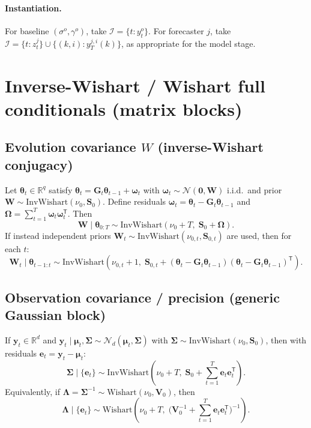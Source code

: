 \documentclass[11pt]{article}
\newcommand{\R}{\mathbb{R}}
\newcommand{\1}{\mathbb{I}}
\newcommand{\N}{\mathcal{N}}
\newcommand{\IW}{\mathrm{InvWishart}}
\newcommand{\W}{\mathrm{Wishart}}
\newcommand{\T}{\mathsf{T}}
\begin{document}
\paragraph{Instantiation.}
For baseline $(\sigma^o,\gamma^o)$, take $\mathcal{I}=\{t: y_t^o\}$.
For forecaster $j$, take $\mathcal{I}=\{t: z_t^j\}\cup\{(k,i): y_T^{j,i}(k)\}$, as appropriate for the model stage.

\section{Inverse-Wishart / Wishart full conditionals (matrix blocks)}

\subsection{Evolution covariance \texorpdfstring{$W$}{W} (inverse-Wishart conjugacy)}
Let $\bm\theta_t\in\R^q$ satisfy $\bm\theta_t=\bm G_t\bm\theta_{t-1}+\bm\omega_t$ with $\bm\omega_t\sim\N(\bm 0,\bm W)$ i.i.d.\ and prior $\bm W\sim \IW(\nu_0,\bm S_0)$.
Define residuals $\bm\omega_t=\bm\theta_t-\bm G_t\bm\theta_{t-1}$ and $\bm\Omega=\sum_{t=1}^T \bm\omega_t\bm\omega_t^\T$.
Then
\begin{equation}
\bm W\mid \bm\theta_{0:T}\sim \IW(\nu_0+T,\;\bm S_0+\bm\Omega).\label{eq:cond_W_const}
\end{equation}
If instead independent priors $\bm W_t\sim \IW(\nu_{0,t},\bm S_{0,t})$ are used, then for each $t$:
\begin{equation}
\bm W_t\mid \bm\theta_{t-1:t}\sim \IW\!\left(\nu_{0,t}+1,\;\bm S_{0,t}+(\bm\theta_t-\bm G_t\bm\theta_{t-1})(\bm\theta_t-\bm G_t\bm\theta_{t-1})^\T\right).\label{eq:cond_W_timevary}
\end{equation}

\subsection{Observation covariance / precision (generic Gaussian block)}
If $\bm y_t\in\R^d$ and $\bm y_t\mid \bm\mu_t,\bm\Sigma\sim \N_d(\bm\mu_t,\bm\Sigma)$ with $\bm\Sigma\sim\IW(\nu_0,\bm S_0)$, then with residuals $\bm e_t=\bm y_t-\bm\mu_t$:
\begin{equation}
\bm\Sigma\mid \{\bm e_t\}\sim \IW\!\left(\nu_0+T,\;\bm S_0+\sum_{t=1}^T \bm e_t\bm e_t^\T\right).\label{eq:cond_Sigma}
\end{equation}
Equivalently, if $\bm\Lambda=\bm\Sigma^{-1}\sim \W(\nu_0,\bm V_0)$, then
\begin{equation}
\bm\Lambda\mid \{\bm e_t\}\sim \W\!\left(\nu_0+T,\;\Big(\bm V_0^{-1}+\sum_{t=1}^T \bm e_t\bm e_t^\T\Big)^{-1}\right).\label{eq:cond_Lambda}
\end{equation}
\end{document}
